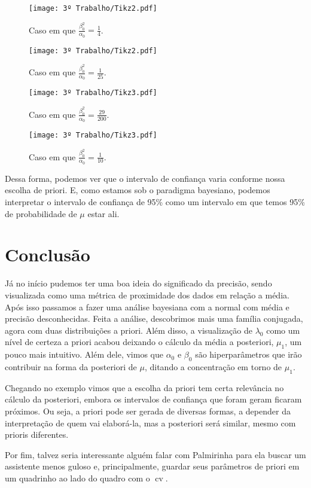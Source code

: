 \documentclass{article}
\begin{document}
\begin{multicols}{2}
    \begin{figure}[H]
        \texttt{[image: 3º Trabalho/Tikz2.pdf]}
        \caption{Caso em que $\frac{\beta_0^2}{\alpha_0} = \frac{1}{4}$.}
    \end{figure}
    \begin{figure}[H]
        \texttt{[image: 3º Trabalho/Tikz2.pdf]}
        \caption{Caso em que $\frac{\beta_0^2}{\alpha_0} = \frac{1}{25}$.}
    \end{figure}
    \begin{figure}[H]
        \texttt{[image: 3º Trabalho/Tikz3.pdf]}
        \caption{Caso em que $\frac{\beta_0^2}{\alpha_0} = \frac{29}{200}$.}
    \end{figure}
    \begin{figure}[H]
        \texttt{[image: 3º Trabalho/Tikz3.pdf]}
        \caption{Caso em que $\frac{\beta_0^2}{\alpha_0} = \frac{1}{10}$.}
    \end{figure}
\end{multicols}

Dessa forma, podemos ver que o intervalo de confiança varia conforme nossa escolha de priori. E, como estamos sob o paradigma bayesiano, podemos interpretar o intervalo de confiança de 95\% como um intervalo em que temos 95\% de probabilidade de $\mu$ estar ali.

\section*{Conclusão}

Já no início pudemos ter uma boa ideia do significado da precisão, sendo visualizada como uma métrica de proximidade dos dados em relação a média. Após isso passamos a fazer uma análise bayesiana com a normal com média e precisão desconhecidas. Feita a análise, descobrimos mais uma família conjugada, agora com duas distribuições a priori. Além disso, a visualização de $\lambda_0$ como um nível de certeza a priori acabou deixando o cálculo da média a posteriori, $\mu_1$, um pouco mais intuitivo. Além dele, vimos que $\alpha_0$ e $\beta_0$ são hiperparâmetros que irão contribuir na forma da posteriori de $\mu$, ditando a concentração em torno de $\mu_1$.

Chegando no exemplo vimos que a escolha da priori tem certa relevância no cálculo da posteriori, embora os intervalos de confiança que foram geram ficaram próximos. Ou seja, a priori pode ser gerada de diversas formas, a depender da interpretação de quem vai elaborá-la, mas a posteriori será similar, mesmo com prioris diferentes.

Por fim, talvez seria interessante alguém falar com Palmirinha para ela buscar um assistente menos guloso e, principalmente, guardar seus parâmetros de priori em um quadrinho ao lado do quadro com o $\operatorname{cv}$.

\printbibliography
\end{document}
